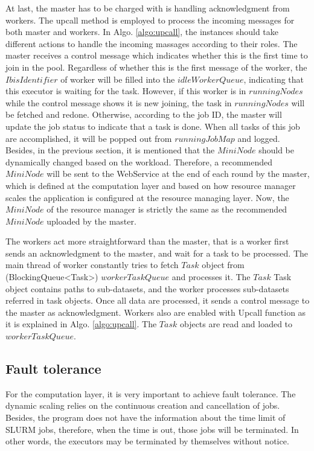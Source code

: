 At last, the master has to be charged with is handling acknowledgment from workers. 
The upcall method is employed to process the incoming messages for both master and workers. 
In Algo. \ref{algo:upcall}, the instances should take different actions to handle the incoming massages according to their roles. 
The master receives a control message which indicates whether this is the first time to join in the pool. 
Regardless of whether this is the first message of the worker, the  $IbisIdentifier$ of worker will be filled into the $idleWorkerQueue$, indicating that this executor is waiting for the task.
However, if this worker is in $runningNodes$ while the control message shows it is new joining, the task in $runningNodes$ will be fetched and redone.
Otherwise, according to the job ID, the master will update the job status to indicate that a task is done. 
When all tasks of this job are accomplished, it will be popped out from  $runningJobMap$ and logged.
Besides, in the previous section, it is mentioned that the $MiniNode$ should be dynamically changed based on the workload.
Therefore, a recommended $MiniNode$ will be sent to the WebService at the end of each round by the master, which is defined at the computation layer and based on how resource manager scales the application is configured at the resource managing layer.
Now, the $MiniNode$ of the resource manager is strictly the same as the recommended $MiniNode$ uploaded by the master.

The workers act more straightforward than the master, that is a worker first sends an acknowledgment to the master, and wait for a task to be processed. 
The main thread of worker constantly tries to fetch  $Task$ object from (BlockingQueue<Task>) $workerTaskQueue$ and processes it.
The $Task$ Task object contains paths to sub-datasets, and the worker processes sub-datasets referred in task objects. Once all data are processed, it sends a control message to the master as acknowledgment.
Workers also are enabled with Upcall function as it is explained in Algo. \ref{algo:upcall}. The $Task$ objects are read and loaded to $workerTaskQueue$.

\subsection{Fault tolerance}

For the computation layer, it is very important to achieve fault tolerance. 
The dynamic scaling relies on the continuous creation and cancellation of jobs. 
Besides, the program does not have the information about the time limit of SLURM jobs, therefore, when the time is out, those jobs will be terminated. 
In other words, the executors may be terminated by themselves without notice.

